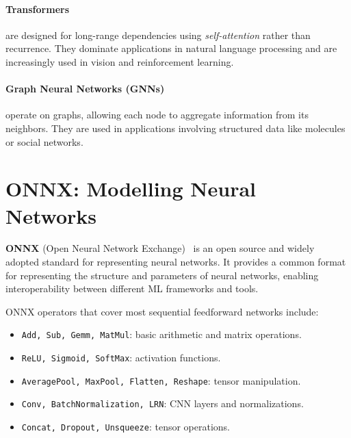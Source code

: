 \documentclass[oneside,11pt,dvipsnames]{book}
\numberwithin{equation}{section}
\theoremstyle{definition}
\theoremstyle{remark}
\begin{document}
\paragraph{Transformers} are designed for long-range dependencies using \emph{self-attention} rather than recurrence. They dominate applications in natural language processing and are increasingly used in vision and reinforcement learning.

\paragraph{Graph Neural Networks (GNNs)} operate on graphs, allowing each node to aggregate information from its neighbors. They are used in applications involving structured data like molecules or social networks.



\section{ONNX: Modelling Neural Networks}\label{sec:onnx}

\textbf{ONNX} (Open Neural Network Exchange)~\cite{onnx} is an open source and widely adopted standard for representing neural networks. It provides a common format for representing the structure and parameters of neural networks, enabling interoperability between different ML frameworks and tools.



ONNX operators that cover most sequential feedforward networks include: 
\begin{itemize}
    \item \texttt{Add, Sub, Gemm, MatMul}: basic arithmetic and matrix operations.
    \item \texttt{ReLU, Sigmoid, SoftMax}: activation functions.
    \item \texttt{AveragePool, MaxPool, Flatten, Reshape}: tensor manipulation.
    \item \texttt{Conv, BatchNormalization, LRN}: CNN layers and normalizations.
    \item \texttt{Concat, Dropout, Unsqueeze}: tensor operations.
\end{itemize}
\end{document}
